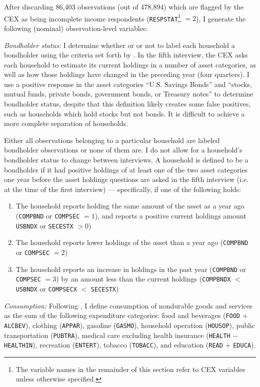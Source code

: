After discarding 86,403 observations (out of 478,894) which are flagged by the CEX as being incomplete income respondents (\texttt{RESPSTAT}\footnote{The variable names in the remainder of this section refer to CEX variables unless otherwise specified.} $= 2$), I generate the following (nominal) observation-level variables:

\textit{Bondholder status:} I determine whether or or not to label each household a bondholder using the criteria set forth by \cite{vissing02}. In the fifth interview, the CEX asks each household to estimate its current holdings in a number of asset categories, as well as how those holdings have changed in the preceding year (four quarters). I use a positive response in the asset categories ``U.S. Savings Bonds'' and ``stocks, mutual funds, private bonds, government bonds, or Treasury notes'' to determine bondholder status, despite that this definition likely creates some false positives, such as households which hold stocks but not bonds. It is difficult to achieve a more complete separation of households.

Either all observations belonging to a particular household are labeled bondholder observations or none of them are. I do not allow for a household's bondholder status to change between interviews. A household is defined to be a bondholder if it had positive holdings of at least one of the two asset categories one year before the asset holdings questions are asked in the fifth interview (i.e. at the time of the first interview) --- specifically, if one of the following holds:
\begin{enumerate}
\item The household reports holding the same amount of the asset as a year ago (\texttt{COMPBND} or \texttt{COMPSEC} $= 1$), and reports a positive current holdings amount \texttt{USBNDX} or \texttt{SECESTX} $> 0$)
\item The household reports lower holdings of the asset than a year ago (\texttt{COMPBND} or \texttt{COMPSEC} $= 2$)
\item The household reports an increase in holdings in the past year (\texttt{COMPBND} or \texttt{COMPSEC} $= 3$) by an amount less than the current holdings (\texttt{COMPBNDX} $<$ \texttt{USBNDX} or \texttt{COMPSECX} $<$ \texttt{SECESTX})
\end{enumerate}

\textit{Consumption:} Following \cite{heathcote10}, I define consumption of nondurable goods and services as the sum of the following expenditure categories: food and beverages (\texttt{FOOD} $+$ \texttt{ALCBEV}), clothing (\texttt{APPAR}), gasoline (\texttt{GASMO}), household operation (\texttt{HOUSOP}), public transportation (\texttt{PUBTRA}), medical care excluding health insurance (\texttt{HEALTH} $-$ \texttt{HEALTHIN}), recreation (\texttt{ENTERT}), tobacco (\texttt{TOBACC}), and education (\texttt{READ} $+$ \texttt{EDUCA}).

